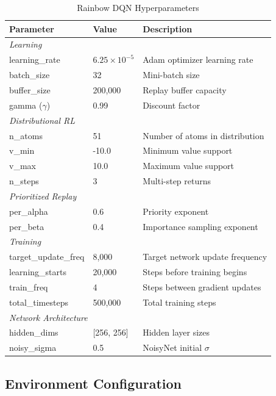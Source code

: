 \documentclass[11pt,a4paper]{article}
\begin{document}
\begin{table}[H]
\centering
\caption{Rainbow DQN Hyperparameters}
\label{tab:rainbow-params}
\begin{tabular}{lll}
\toprule
\textbf{Parameter} & \textbf{Value} & \textbf{Description} \\
\midrule
\multicolumn{3}{l}{\textit{Learning}} \\
learning\_rate & $6.25 \times 10^{-5}$ & Adam optimizer learning rate \\
batch\_size & 32 & Mini-batch size \\
buffer\_size & 200,000 & Replay buffer capacity \\
gamma ($\gamma$) & 0.99 & Discount factor \\
\midrule
\multicolumn{3}{l}{\textit{Distributional RL}} \\
n\_atoms & 51 & Number of atoms in distribution \\
v\_min & -10.0 & Minimum value support \\
v\_max & 10.0 & Maximum value support \\
n\_steps & 3 & Multi-step returns \\
\midrule
\multicolumn{3}{l}{\textit{Prioritized Replay}} \\
per\_alpha & 0.6 & Priority exponent \\
per\_beta & 0.4 & Importance sampling exponent \\
\midrule
\multicolumn{3}{l}{\textit{Training}} \\
target\_update\_freq & 8,000 & Target network update frequency \\
learning\_starts & 20,000 & Steps before training begins \\
train\_freq & 4 & Steps between gradient updates \\
total\_timesteps & 500,000 & Total training steps \\
\midrule
\multicolumn{3}{l}{\textit{Network Architecture}} \\
hidden\_dims & [256, 256] & Hidden layer sizes \\
noisy\_sigma & 0.5 & NoisyNet initial $\sigma$ \\
\bottomrule
\end{tabular}
\end{table}

\subsection{Environment Configuration}
\end{document}
